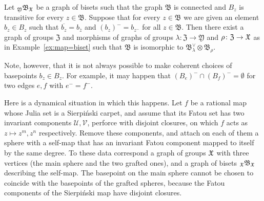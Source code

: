 \documentclass{amsart}
\begin{document}
\begin{exple}[See Lemma~\ref{lem:biset=fibre}; a partial converse to
  Example~\ref{ex:map=biset}]
  Let ${}_{\mathfrak Y}\mathfrak B_{\mathfrak X}$ be a graph of bisets such that the
  graph $\mathfrak B$ is connected and $B_z$ is transitive for every $z\in
  \mathfrak B$. Suppose that for every $z\in\mathfrak B$ we are given an
  element $b_z\in B_z$ such that $\overline{b_z}=b_{\overline z}$ and
  $(b_z)^-=b_{z^-}$ for all $z\in\mathfrak B$. Then there exist a graph of
  groups $\mathfrak Z$ and morphisms of graphs of groups
  $\lambda\colon\mathfrak Z\to\mathfrak Y$ and $\rho\colon\mathfrak
  Z\to{\mathfrak X}$ as in Example~\ref{ex:map=biset} such that $\mathfrak B$ is isomorphic to $\mathfrak
  B_\lambda^\vee\otimes\mathfrak B_\rho$.

  Note, however, that it is not always possible to make coherent choices of
  basepoints $b_z\in B_z$. For example, it may happen that $(B_e)^{-}\cap
  (B_f)^-=\emptyset$ for two edges $e,f$ with $e^-=f^-$.
 
  Here is a dynamical situation in which this happens. Let $f$ be a
  rational map whose Julia set is a Sierpi\'nski carpet, and assume that
  its Fatou set has two invariant components $\mathcal U,\mathcal V$,
  perforce with disjoint closures, on which $f$ acts as $z\mapsto z^m,z^n$
  respectively. Remove these components, and attach on each of them a
  sphere with a self-map that has an invariant Fatou component mapped to
  itself by the same degree. To these data correspond a graph of groups
  ${\mathfrak X}$ with three vertices (the main sphere and the two grafted ones), and
  a graph of bisets ${}_{\mathfrak X}\mathfrak B_{\mathfrak X}$ describing the self-map. The
  basepoint on the main sphere cannot be chosen to coincide with the
  basepoints of the grafted spheres, because the Fatou components of the
  Sierpi\'nski map have disjoint closures.
\end{exple}
\end{document}
